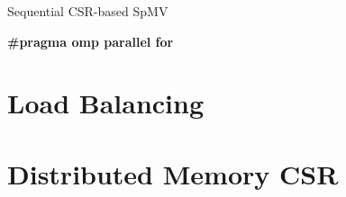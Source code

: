 \begin{algorithm}[H]
    \caption{Sequential CSR-based SpMV}
    \SetAlgoVlined

    \textbf{\#pragma omp parallel for}\\
\end{algorithm}

\section{Load Balancing}




\section{Distributed Memory CSR}








